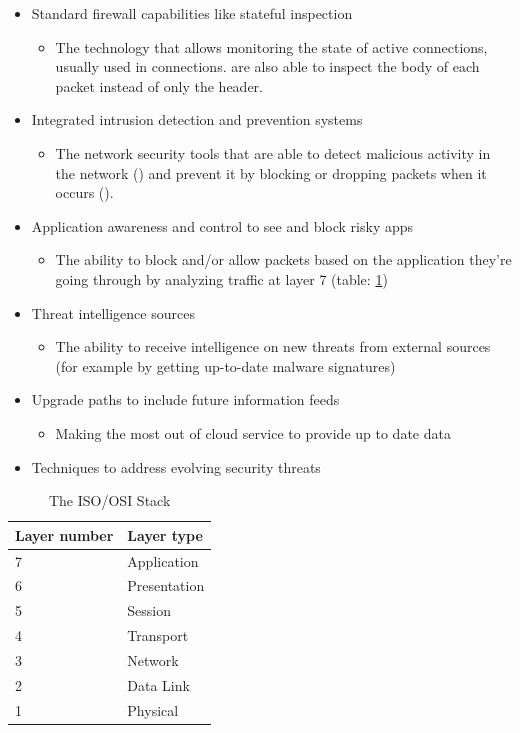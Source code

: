 \begin{itemize}
 \item Standard firewall capabilities like stateful inspection
    \begin{itemize}
     \item The technology that allows monitoring the state of active connections, usually used in  connections.
      are also able to inspect the body of each packet instead of only the header.
    \end{itemize}
 \item Integrated intrusion detection and prevention systems
    \begin{itemize}
     \item The network security tools that are able to detect malicious activity in the network () and prevent it by blocking or dropping packets when it occurs ().
    \end{itemize}
 \item Application awareness and control to see and block risky apps
    \begin{itemize}
        \item The ability to block and/or allow packets based on the application they're going through by analyzing traffic at layer 7 (table: \ref{table:isoosi})
    \end{itemize}
 \item Threat intelligence sources
    \begin{itemize}
     \item The ability to receive intelligence on new threats from external sources (for example by getting up-to-date malware signatures)
    \end{itemize}
 \item Upgrade paths to include future information feeds
 \begin{itemize}
  \item Making the most out of cloud service to provide up to date data
 \end{itemize}
 \item Techniques to address evolving security threats
\end{itemize}

\begin{table}[hb]
 \centering
 \begin{tabular}{|l||l|}
 \hline
 Layer number & Layer type \\
 \hline
 7 & Application \\
 \hline
 6 & Presentation \\
 \hline
 5 & Session \\
 \hline
 4 & Transport \\
 \hline
 3 & Network \\
 \hline
 2 & Data Link \\
 \hline
 1 & Physical \\
 \hline
 \end{tabular}
 \caption{The ISO/OSI Stack}
 \label{table:isoosi}
\end{table}


